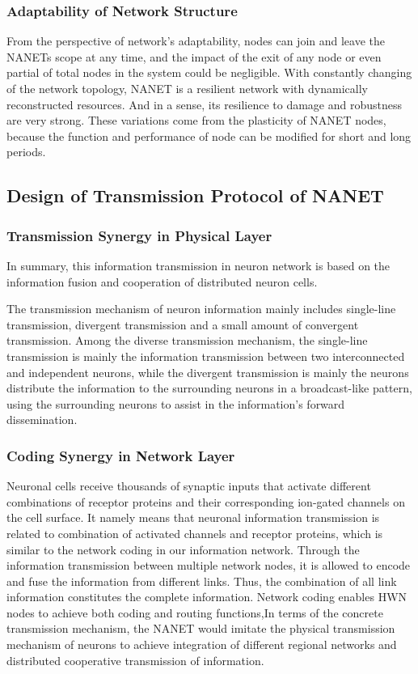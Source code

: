 \documentclass[journal,comsoc]{IEEEtran}
\begin{document}
			\subsubsection{Adaptability of Network Structure}
				
				From the perspective of network's adaptability, nodes can join and leave the NANETs scope at any time, 
				and the impact of the exit of any node or even partial of total nodes in the system could be negligible.
				With constantly changing of the network topology,  NANET is a resilient network with dynamically reconstructed resources.
				And in a sense, its resilience to damage and robustness are very strong.
				These variations come from the plasticity of NANET nodes, because the function and performance of node can be modified for short and long periods.
		
		\subsection{Design of Transmission Protocol of NANET}
			\subsubsection{Transmission Synergy in Physical Layer}
				In summary, this information transmission in neuron network is based on the information fusion and cooperation of distributed neuron cells.
				
				The transmission mechanism of neuron information mainly includes single-line transmission, divergent transmission and a small amount of convergent transmission.
				Among the diverse transmission mechanism, the single-line transmission is mainly the information transmission between two interconnected and independent neurons, while the divergent transmission is mainly the neurons distribute the information to the surrounding neurons in a broadcast-like pattern, using the surrounding neurons to assist in the information's forward dissemination.
				
				
			\subsubsection{Coding Synergy in Network Layer}
				Neuronal cells receive thousands of synaptic inputs that activate different combinations of receptor proteins and their corresponding ion-gated channels on the cell surface.
				It namely means that neuronal information transmission is related to combination of activated channels and receptor proteins, which is similar to the network coding in our information network. 
				Through the information transmission between multiple network nodes, it is allowed to encode and fuse the information from different links. 
				Thus, the combination of all link information constitutes the complete information.
				Network coding enables HWN nodes to achieve both coding and routing functions,In terms of the concrete transmission mechanism, the NANET would imitate the physical transmission mechanism of neurons 
				to achieve integration of different regional networks and distributed cooperative transmission of information.
				
\end{document}
